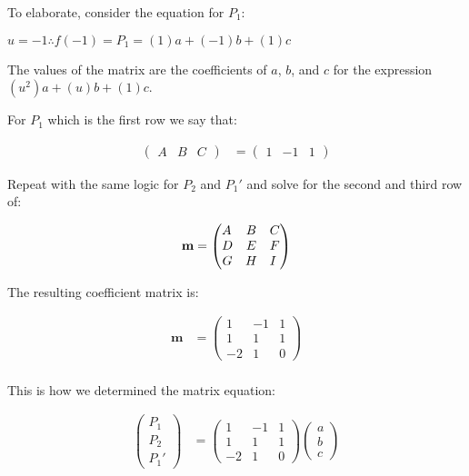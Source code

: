 \documentclass[12pt]{article}
\begin{document}
To elaborate, consider the equation for $P_1$:

$u = -1 \therefore f(-1) = P_1 = (1)a + (-1)b + (1)c$

The values of the matrix are the coefficients of 
$a$, $b$, and $c$ for the expression $(u^2)a + (u)b + (1)c$.

\therefore For $P_1$ which is the first row we say that:

\begin{align}
\begin{pmatrix}
A &
B &
C
\end{pmatrix} \nonumber
&=
\begin{pmatrix}
1 &
-1 &
1
\end{pmatrix} \nonumber
\end{align}

Repeat with the same logic for $P_2$ and $P_1'$ and solve for the second and third row of:

\begin{align}
\textbf{m} &=
\begin{pmatrix}
A \hfill & B & C \\
D & E & F \hfill \\
G & H & I \hfill 
\end{pmatrix} \nonumber \\
\end{align}

The resulting coefficient matrix is:

\begin{align}
\textbf{m} &=
\begin{pmatrix}
1 & -1 & 1 \\
1 & 1 & 1 \\
-2 & 1 & 0  
\end{pmatrix} \nonumber \\
\end{align}

This is how we determined the matrix equation:

\begin{align}
\begin{pmatrix}
P_1 \\
P_2 \\
P_1'
\end{pmatrix} \nonumber
&=
\begin{pmatrix}
1 & -1 & 1 \\
1 & 1 & 1 \\
-2 & 1 & 0  
\end{pmatrix} \nonumber
\begin{pmatrix}
a \\
b \\
c
\end{pmatrix} \nonumber \\
\end{align}
\end{document}
